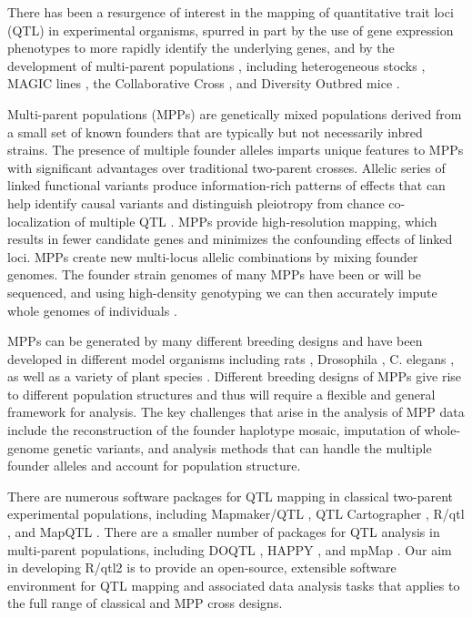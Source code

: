 \documentclass[12pt,letterpaper]{article}
\begin{document}
There has been a resurgence of interest in the mapping of quantitative
trait loci (QTL) in experimental organisms, spurred in part by
the use of gene expression phenotypes \citep[eQTL mapping; see][]{albert2015}
to more rapidly identify the underlying genes, and by
the development
of multi-parent populations \citep{dekoning2017}, including heterogeneous
stocks \citep{mott2000,mott2002}, MAGIC lines \citep{cavanagh2008, kover2009}, the Collaborative
Cross \citep{churchill2004}, and Diversity Outbred mice
\citep{churchill2012, svenson2012}.

Multi-parent populations (MPPs) are genetically mixed populations
derived from a small set of known founders that are typically but not
necessarily inbred strains.
The presence of multiple founder alleles imparts unique features to MPPs
with significant advantages over traditional two-parent crosses.
Allelic series of linked functional variants produce information-rich patterns of effects
that can help identify causal variants and distinguish pleiotropy from
chance co-localization of multiple QTL \citep{king2012}.
MPPs provide high-resolution mapping, which results in fewer candidate
genes and minimizes the confounding effects of linked loci.
MPPs create new multi-locus allelic combinations by mixing founder genomes.
The founder strain genomes of many MPPs have been or will be sequenced,
and using high-density genotyping we can then accurately impute whole
genomes of individuals \citep{oreper2017}.

MPPs can be generated by many different breeding designs and
have been developed in different model organisms including
rats \citep{solbergwoods2017},
Drosophila \citep{king2012},
C. elegans \citep{noble2017},
as well as a variety of
plant species \citep{kover2009,dellacqua2015,bandillo2013,huang2012}.
Different breeding designs of MPPs give rise to different population structures
and thus will require a flexible and general framework for analysis.
The key challenges that arise in the analysis of MPP data include
the reconstruction of the founder haplotype mosaic,
imputation of whole-genome genetic variants,
and analysis methods that can handle the multiple founder alleles
and account for population structure.

There are numerous software packages for QTL mapping in classical two-parent experimental
populations, including Mapmaker/QTL \citep{lincoln1990}, QTL
Cartographer \citep{Basten2002}, R/qtl \citep{broman2003,
  broman_sen}, and MapQTL \citep{mapqtl}.
There are a smaller number of packages for QTL analysis in
multi-parent populations, including DOQTL \citep{gatti2014}, HAPPY
\citep{mott2000}, and mpMap \citep{mpMap}.
Our aim in developing R/qtl2 is to provide an open-source, extensible
software environment for QTL mapping and associated data analysis tasks that
applies to the full range of classical and MPP cross designs.
\end{document}
